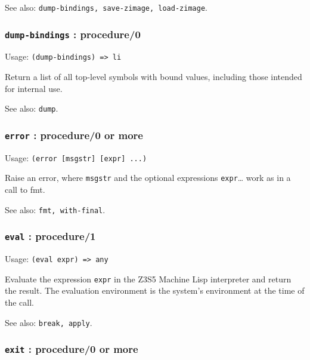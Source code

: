 \documentclass[
]{article}
\newcommand{\passthrough}[1]{#1}
\begin{document}
See also:
\passthrough{\lstinline!dump-bindings, save-zimage, load-zimage!}.

\hypertarget{dump-bindings-procedure0}{%
\subsubsection{\texorpdfstring{\texttt{dump-bindings} :
procedure/0}{dump-bindings : procedure/0}}\label{dump-bindings-procedure0}}

Usage: \passthrough{\lstinline!(dump-bindings) => li!}

Return a list of all top-level symbols with bound values, including
those intended for internal use.

See also: \passthrough{\lstinline!dump!}.

\hypertarget{error-procedure0-or-more}{%
\subsubsection{\texorpdfstring{\texttt{error} : procedure/0 or
more}{error : procedure/0 or more}}\label{error-procedure0-or-more}}

Usage: \passthrough{\lstinline!(error [msgstr] [expr] ...)!}

Raise an error, where \passthrough{\lstinline!msgstr!} and the optional
expressions \passthrough{\lstinline!expr!}\ldots{} work as in a call to
fmt.

See also: \passthrough{\lstinline!fmt, with-final!}.

\hypertarget{eval-procedure1}{%
\subsubsection{\texorpdfstring{\texttt{eval} :
procedure/1}{eval : procedure/1}}\label{eval-procedure1}}

Usage: \passthrough{\lstinline!(eval expr) => any!}

Evaluate the expression \passthrough{\lstinline!expr!} in the Z3S5
Machine Lisp interpreter and return the result. The evaluation
environment is the system's environment at the time of the call.

See also: \passthrough{\lstinline!break, apply!}.

\hypertarget{exit-procedure0-or-more}{%
\subsubsection{\texorpdfstring{\texttt{exit} : procedure/0 or
more}{exit : procedure/0 or more}}\label{exit-procedure0-or-more}}
\end{document}
